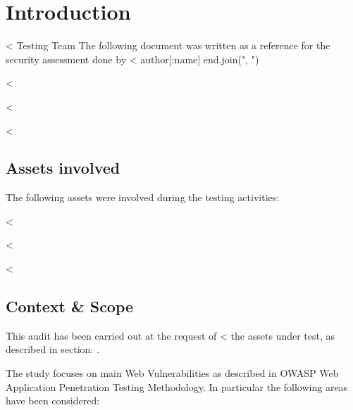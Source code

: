 

\chapter{Introduction}\label{ch:introduction}

  <%
         Testing Team %
  The following document was written as a reference for the security
  assessment done by <%
    author[:name]
  end.join(", ") %

  <%

    <%

  <%
  \section{Assets involved}\label{sec:assets}

    The following assets were involved during the testing activities:

    \begin{itemize}
      <%
        <%
          \item \textbf{<%
        <%
          \item \textbf{<%
        <%
      <%
    \end{itemize}

  <%

    <%

  <%
  \section{Context \& Scope}\label{sec:scope}

    This audit has been carried out at the request of
    <%
    the assets under test, as described in section: .

    The study focuses on main Web Vulnerabilities as described in OWASP Web
    Application Penetration Testing Methodology. In particular the following
    areas have been considered:

